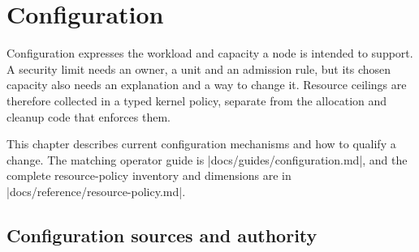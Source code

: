 \chapter{Configuration}
\label{chap:configuration}

Configuration expresses the workload and capacity a node is intended to support.
A security limit needs an owner, a unit and an admission rule, but its chosen
capacity also needs an explanation and a way to change it. Resource ceilings
are therefore collected in a typed kernel policy, separate from the allocation
and cleanup code that enforces them.

This chapter describes current configuration mechanisms and how to qualify a
change. The matching operator guide is
\repofile|docs/guides/configuration.md|, and the complete resource-policy inventory
and dimensions are in \repofile|docs/reference/resource-policy.md|.

\section{Configuration sources and authority}

